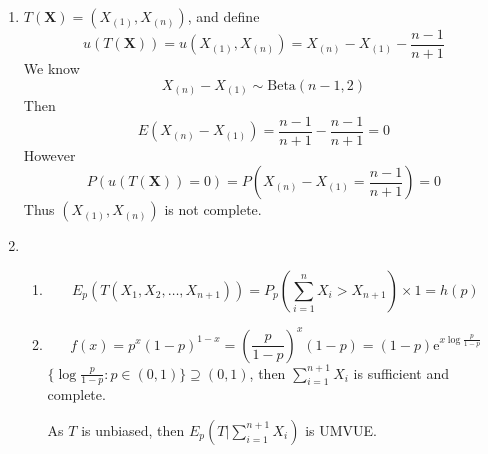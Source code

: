 \documentclass{article}
\begin{document}
\begin{enumerate}[leftmargin = 0 em, label = \arabic*., font = \bfseries]
	\item
	      $T(\bm X) = (X_{(1)}, X_{(n)})$, and define
	      \[u(T(\bm X)) = u(X_{(1)}, X_{(n)}) = X_{(n)} - X_{(1)} - \frac{n-1}{n+1}\]
	      We know
	      \[X_{(n)} - X_{(1)} \sim \mathrm{Beta}(n-1,2)\]
	      Then
	      \[E(X_{(n)} - X_{(1)}) = \frac{n-1}{n+1} - \frac{n-1}{n+1} = 0\]
	      However
	      \[P(u(T(\bm X) )= 0) = P\left(X_{(n)} - X_{(1)} = \frac{n-1}{n+1}\right) = 0 \]
	      Thus $(X_{(1)}, X_{(n)})$ is not complete.
	\item
	      \begin{enumerate}
		      \item
		            \[E_p (T(X_1 , X_2, \ldots, X_{n+1})) = P_p \left(\sum_{i=1}^n X_i > X_{n+1}\right)\times 1 = h(p)\]

		      \item
		            \[f(x) = p^x (1 - p)^{1-x} = \left(\frac{p}{1-p}\right)^x (1-p) = (1-p) \mathrm{e}^{x \log \frac{p}{1-p}}\]
		            $\{\log \frac{p}{1-p} : p \in (0,1)\} \supseteq (0,1)$, then $\sum_{i=1}^{n+1} X_i$ is sufficient and complete.

		            As $T$ is unbiased, then $E_p (T|\sum_{i=1}^{n+1} X_i)$ is UMVUE.


\end{enumerate}
\end{enumerate}
\end{document}
